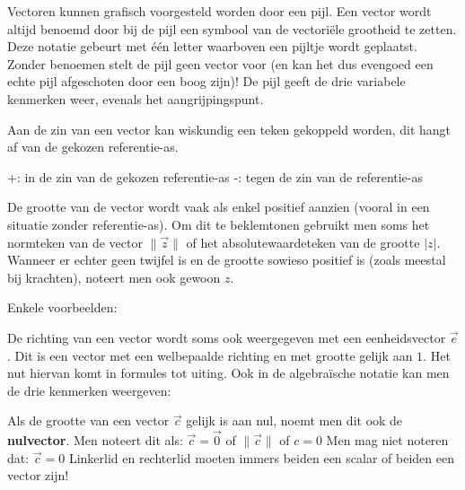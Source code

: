 \documentclass{ximera}
\begin{document}
	\author{Bart Lambregs}
    \xmsource\xmuitleg

Vectoren kunnen grafisch voorgesteld worden door een pijl.  
Een vector wordt altijd benoemd door bij de pijl een symbool van de vectoriële grootheid te zetten. 
Deze notatie gebeurt met één letter waarboven een pijltje wordt geplaatst. 
Zonder benoemen stelt de pijl geen vector voor (en kan het dus evengoed een echte pijl afgeschoten door een boog zijn)! De pijl geeft de drie variabele kenmerken weer, evenals het aangrijpingspunt.	




Aan de zin van een vector kan wiskundig een teken gekoppeld worden, dit hangt af van de gekozen referentie-as. 

+: in de zin van de gekozen referentie-as    -: tegen de zin van de referentie-as


De grootte van de vector wordt vaak als enkel positief aanzien (vooral in een situatie zonder referentie-as). 
Om dit te beklemtonen gebruikt men soms het normteken van de vector \( \lVert \vec{z} \rVert \) of het absolutewaardeteken van de grootte \(\lvert z \rvert \). 
Wanneer er echter geen twijfel is en de grootte sowieso positief is (zoals meestal bij krachten), noteert men ook gewoon \(z\). 

Enkele voorbeelden:



De richting van een vector wordt soms ook weergegeven met een eenheidsvector \(\vec{e}\). Dit is een vector met een welbepaalde richting en met grootte gelijk aan \(1\). Het nut hiervan komt in formules tot uiting. Ook in de algebraïsche notatie kan men de drie kenmerken weergeven:



\begin{remark}
Als de grootte van een vector \(\vec{c}\) gelijk is aan nul, noemt men dit ook de \textbf{nulvector}. 
Men noteert dit als: \(\vec{c} = \vec{0}\)   of  \( \lVert \vec{c} \rVert \)  of   \( c = 0 \)
Men mag niet noteren dat: \( \vec{c} = 0\)  
Linkerlid en rechterlid moeten immers beiden een scalar of beiden een vector zijn!
\end{remark}
	
\end{document}
